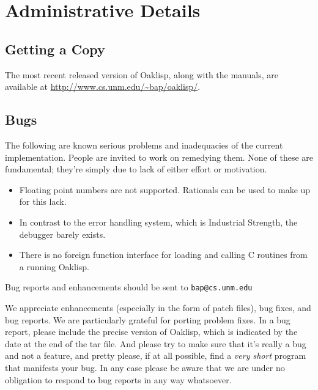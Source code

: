 \chapter{Administrative Details}

\section{Getting a Copy}

The most recent released version of Oaklisp, along with the manuals,
are available at \url{http://www.cs.unm.edu/~bap/oaklisp/}.

\section{Bugs}

The following are known serious problems and inadequacies of the
current implementation.  People are invited to work on remedying them.
None of these are fundamental; they're simply due to lack of either
effort or motivation.

\begin{itemize}
\item Floating point numbers are not supported.  Rationals can be
used to make up for this lack.

\item In contrast to the error handling system, which is Industrial
Strength, the debugger barely exists.

\item There is no foreign function interface for loading and calling
C routines from a running Oaklisp.

%
\end{itemize}

Bug reports and enhancements should be sent to \texttt{bap@cs.unm.edu}

We appreciate enhancements (especially in the form of patch files),
bug fixes, and bug reports.  We are particularly grateful for porting
problem fixes.  In a bug report, please include the precise version of
Oaklisp, which is indicated by the date at the end of the tar file.
And please try to make sure that it's really a bug and not a feature,
and pretty please, if at all possible, find a \emph{very short} program
that manifests your bug.  In any case please be aware that we are
under no obligation to respond to bug reports in any way whatsoever.

